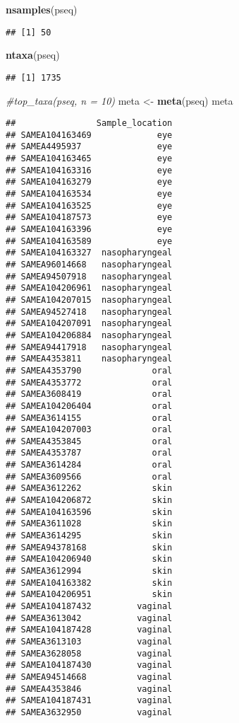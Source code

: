 \documentclass[]{article}
\newenvironment{Shaded}{\begin{snugshade}}{\end{snugshade}}
\newcommand{\CommentTok}[1]{\textcolor[rgb]{0.56,0.35,0.01}{\textit{#1}}}
\newcommand{\KeywordTok}[1]{\textcolor[rgb]{0.13,0.29,0.53}{\textbf{#1}}}
\newcommand{\NormalTok}[1]{#1}
\newcommand{\StringTok}[1]{\textcolor[rgb]{0.31,0.60,0.02}{#1}}
\begin{document}
\begin{Shaded}
\begin{Highlighting}[]
\KeywordTok{nsamples}\NormalTok{(pseq)}
\end{Highlighting}
\end{Shaded}

\begin{verbatim}
## [1] 50
\end{verbatim}

\begin{Shaded}
\begin{Highlighting}[]
\KeywordTok{ntaxa}\NormalTok{(pseq)}
\end{Highlighting}
\end{Shaded}

\begin{verbatim}
## [1] 1735
\end{verbatim}

\begin{Shaded}
\begin{Highlighting}[]
\CommentTok{#top_taxa(pseq, n = 10)}
\NormalTok{meta <-}\StringTok{ }\KeywordTok{meta}\NormalTok{(pseq)}
\NormalTok{meta}
\end{Highlighting}
\end{Shaded}

\begin{verbatim}
##                Sample_location
## SAMEA104163469             eye
## SAMEA4495937               eye
## SAMEA104163465             eye
## SAMEA104163316             eye
## SAMEA104163279             eye
## SAMEA104163534             eye
## SAMEA104163525             eye
## SAMEA104187573             eye
## SAMEA104163396             eye
## SAMEA104163589             eye
## SAMEA104163327  nasopharyngeal
## SAMEA96014668   nasopharyngeal
## SAMEA94507918   nasopharyngeal
## SAMEA104206961  nasopharyngeal
## SAMEA104207015  nasopharyngeal
## SAMEA94527418   nasopharyngeal
## SAMEA104207091  nasopharyngeal
## SAMEA104206884  nasopharyngeal
## SAMEA94417918   nasopharyngeal
## SAMEA4353811    nasopharyngeal
## SAMEA4353790              oral
## SAMEA4353772              oral
## SAMEA3608419              oral
## SAMEA104206404            oral
## SAMEA3614155              oral
## SAMEA104207003            oral
## SAMEA4353845              oral
## SAMEA4353787              oral
## SAMEA3614284              oral
## SAMEA3609566              oral
## SAMEA3612262              skin
## SAMEA104206872            skin
## SAMEA104163596            skin
## SAMEA3611028              skin
## SAMEA3614295              skin
## SAMEA94378168             skin
## SAMEA104206940            skin
## SAMEA3612994              skin
## SAMEA104163382            skin
## SAMEA104206951            skin
## SAMEA104187432         vaginal
## SAMEA3613042           vaginal
## SAMEA104187428         vaginal
## SAMEA3613103           vaginal
## SAMEA3628058           vaginal
## SAMEA104187430         vaginal
## SAMEA94514668          vaginal
## SAMEA4353846           vaginal
## SAMEA104187431         vaginal
## SAMEA3632950           vaginal
\end{verbatim}
\end{document}
